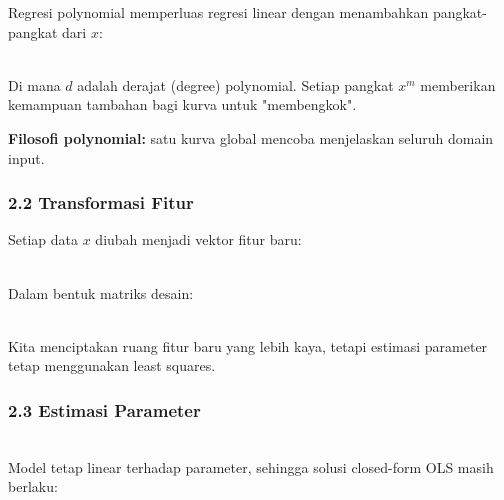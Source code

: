 \documentclass[12pt,a4paper]{article}
\begin{document}
Regresi polynomial memperluas regresi linear dengan menambahkan pangkat-pangkat dari $x$:


\\[
\hat{y}(x) = \beta_0 + \beta_1 x + \beta_2 x^2 + \beta_3 x^3 + \dots + \beta_d x^d
\\]


Di mana $d$ adalah derajat (degree) polynomial. Setiap pangkat $x^m$ memberikan kemampuan tambahan bagi kurva untuk "membengkok".


\textbf{Filosofi polynomial:} satu kurva global mencoba menjelaskan seluruh domain input.


\subsubsection{2.2 Transformasi Fitur}

Setiap data $x$ diubah menjadi vektor fitur baru:


\\[
x \rightarrow (x, x^2, x^3, x^4, x^5)
\\]


Dalam bentuk matriks desain:


\\[
X_{\text{poly}} =

\begin{bmatrix}

x_1 & x_1^2 & x_1^3 & x_1^4 & x_1^5 \\

x_2 & x_2^2 & x_2^3 & x_2^4 & x_2^5 \\

\vdots & \vdots & \vdots & \vdots & \vdots \\

x_n & x_n^2 & x_n^3 & x_n^4 & x_n^5

\end{bmatrix}
\\]


Kita menciptakan ruang fitur baru yang lebih kaya, tetapi estimasi parameter tetap menggunakan least squares.


\subsubsection{2.3 Estimasi Parameter}

\\[
\min_{\beta} \sum_{i=1}^{n} (y_i - \hat{y}(x_i))^2
\\]


Model tetap linear terhadap parameter, sehingga solusi closed-form OLS masih berlaku:
\end{document}
